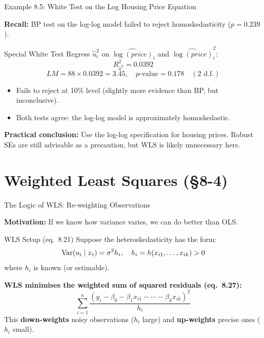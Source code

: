 \documentclass[aspectratio=169, 12pt]{beamer}
\begin{document}
\begin{frame}{Example 8.5: White Test on the Log Housing Price Equation}

  \textbf{Recall:} BP test on the log-log model failed to reject homoskedasticity ($p = 0.239$).

  \smallskip

  \begin{examplebox}{Special White Test}
    Regress $\hat{u}_i^2$ on $\widehat{\log(\textit{price})}_i$ and $\widehat{\log(\textit{price})}_i^2$:
    \[
      R_{\hat{u}^2}^2 = 0.0392
    \]
    \[
      LM = 88 \times 0.0392 = 3.45, \quad p\text{-value} = 0.178 \quad (2 \text{ d.f.})
    \]
  \end{examplebox}

  \smallskip

  \begin{itemize}
    \item Fails to reject at 10\% level (slightly more evidence than BP, but inconclusive).
    \item Both tests agree: the log-log model is approximately homoskedastic.
  \end{itemize}

  \smallskip

  \begin{keybox}
    \textbf{Practical conclusion:} Use the log-log specification for housing prices. Robust SEs are still advisable as a precaution, but WLS is likely unnecessary here.
  \end{keybox}

\end{frame}

\section{Weighted Least Squares (\S8-4)}

\begin{frame}{The Logic of WLS: Re-weighting Observations}

  \textbf{Motivation:} If we know how variance varies, we can do better than OLS.

  \smallskip

  \begin{definitionbox}{WLS Setup (eq.\ 8.21)}
    Suppose the heteroskedasticity has the form:
    \[
      \operatorname{Var}(u_i \mid x_i) = \sigma^2 h_i, \quad h_i = h(x_{i1}, \ldots, x_{ik}) > 0
    \]
    where $h_i$ is known (or estimable).
  \end{definitionbox}

  \smallskip

  \begin{highlightbox}
    \textbf{WLS minimises the weighted sum of squared residuals (eq.\ 8.27):}
    \[
      \sum_{i=1}^n \frac{(y_i - \beta_0 - \beta_1 x_{i1} - \cdots - \beta_k x_{ik})^2}{h_i}
    \]
    This \textbf{down-weights} noisy observations ($h_i$ large) and \textbf{up-weights} precise ones ($h_i$ small).
  \end{highlightbox}

\end{frame}
\end{document}
